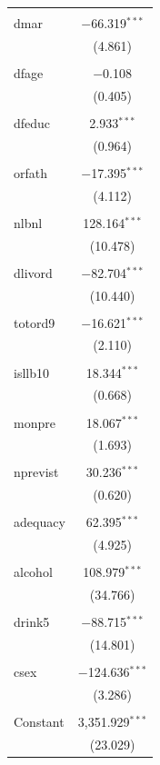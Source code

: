 \documentclass{article}
\begin{document}
\begin{enumerate}[(a)]
\begin{longtable}{@{\extracolsep{5pt}}lc}
  & \\ 
 dmar & $-$66.319$^{***}$ \\ 
  & (4.861) \\ 
  & \\ 
 dfage & $-$0.108 \\ 
  & (0.405) \\ 
  & \\ 
 dfeduc & 2.933$^{***}$ \\ 
  & (0.964) \\ 
  & \\ 
 orfath & $-$17.395$^{***}$ \\ 
  & (4.112) \\ 
  & \\ 
 nlbnl & 128.164$^{***}$ \\ 
  & (10.478) \\ 
  & \\ 
 dlivord & $-$82.704$^{***}$ \\ 
  & (10.440) \\ 
  & \\ 
 totord9 & $-$16.621$^{***}$ \\ 
  & (2.110) \\ 
  & \\ 
 isllb10 & 18.344$^{***}$ \\ 
  & (0.668) \\ 
  & \\ 
 monpre & 18.067$^{***}$ \\ 
  & (1.693) \\ 
  & \\ 
 nprevist & 30.236$^{***}$ \\ 
  & (0.620) \\ 
  & \\ 
 adequacy & 62.395$^{***}$ \\ 
  & (4.925) \\ 
  & \\ 
 alcohol & 108.979$^{***}$ \\ 
  & (34.766) \\ 
  & \\ 
 drink5 & $-$88.715$^{***}$ \\ 
  & (14.801) \\ 
  & \\ 
 csex & $-$124.636$^{***}$ \\ 
  & (3.286) \\ 
  & \\ 
 Constant & 3,351.929$^{***}$ \\ 
  & (23.029) \\ 

\end{longtable}
\end{enumerate}
\end{document}
